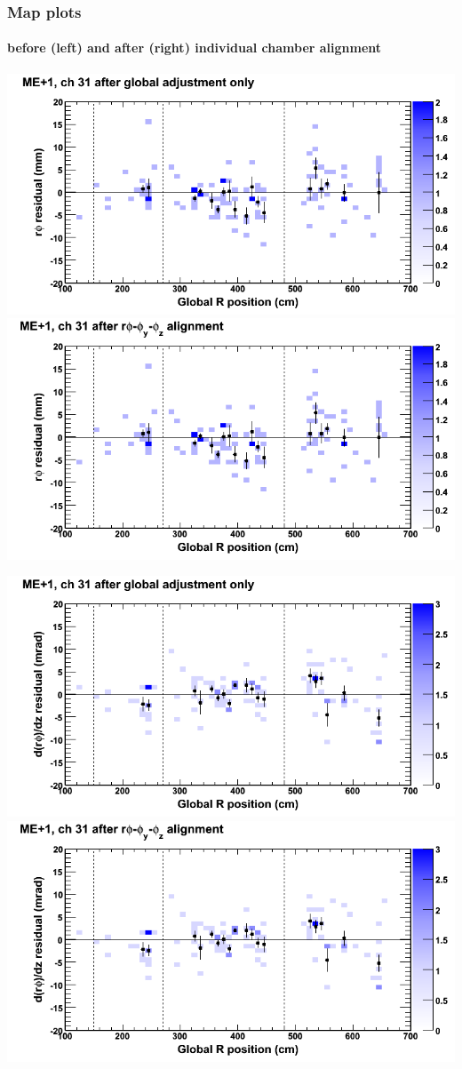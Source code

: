 \documentclass[compress]{beamer}
\begin{document}
\begin{frame}
\frametitle{Map plots}
\framesubtitle{before (left) and after (right) individual chamber alignment}
\includegraphics[width=0.5\linewidth]{ringmapplots_3dof/before_CSCvsr_mep1ch31_x.png} \includegraphics[width=0.5\linewidth]{ringmapplots_3dof/after_CSCvsr_mep1ch31_x.png}

\includegraphics[width=0.5\linewidth]{ringmapplots_3dof/before_CSCvsr_mep1ch31_dxdz.png} \includegraphics[width=0.5\linewidth]{ringmapplots_3dof/after_CSCvsr_mep1ch31_dxdz.png}
\end{frame}
\end{document}
